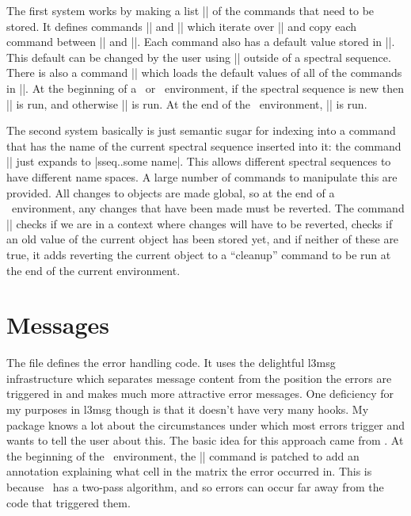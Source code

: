 The first system works by making a list |\sseq@storelist| of the commands that need to be stored. It defines commands |\sseq@storecmds| and |\sseq@getcmds| which iterate over |\sseq@storelist| and copy each command between |\sseq@whatevercommand| and |\sseq@whatevercommand@@@{}|. Each command also has a default value stored in |\sseq@whatevercommand@@default|. This default can be changed by the user using |\sseqset| outside of a spectral sequence. There is also a command |\sseq@storelist@setdefaults| which loads the default values of all of the commands in |\sseq@storelist|. At the beginning of a \sseqdataenv\ or \sseqpageenv\ environment, if the spectral sequence is new then |\sseq@storelist@setdefaults| is run, and otherwise |\sseq@getcmds| is run. At the end of the \sseqdataenv\ environment, |\sseq@storecmds| is run.

The second system basically is just semantic sugar for indexing into a command that has the name of the current spectral sequence inserted into it: the command || just expands to |\csname sseq.\sseq@thename.some name\endcsname|. This allows different spectral sequences to have different name spaces. A large number of commands to manipulate this are provided. All changes to objects are made global, so at the end of a \sseqpageenv\ environment, any changes that have been made must be reverted. The command |\sseq@cleanup@obj| checks if we are in a context where changes will have to be reverted, checks if an old value of the current object has been stored yet, and if neither of these are true, it adds reverting the current object to a ``cleanup'' command to be run at the end of the current environment.

\section{Messages}
The file  defines the error handling code. It uses the delightful l3msg infrastructure which separates message content from the position the errors are triggered in and makes much more attractive error messages. One deficiency for my purposes in l3msg though is that it doesn't have very many hooks. My package knows a lot about the circumstances under which most errors trigger and wants to tell the user about this. The basic idea for this approach came from \tikzcdpkg. At the beginning of the \tikzcdenv\ environment, the |\errmessage| command is patched to add an annotation explaining what cell in the matrix the error occurred in. This is because \tikzcdenv\ has a two-pass algorithm, and so errors can occur far away from the code that triggered them.

